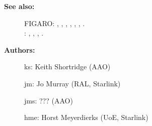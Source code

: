 \begin{description}
\item [\textbf{See also:}]
FIGARO: , , , , , , .\\
: , , , .\\

\item [\textbf{Authors:}]
 ks: Keith Shortridge (AAO)

 jm: Jo Murray (RAL, Starlink)

 jms: ??? (AAO)

 hme: Horst Meyerdierks (UoE, Starlink)
\end{description}
